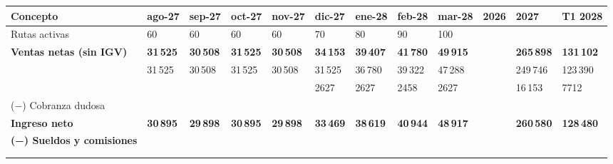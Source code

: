 \documentclass[10.5pt,a4paper]{article}
\begin{document}
{\scriptsize\setlength{\tabcolsep}{2.2pt}\renewcommand{\arraystretch}{0.95}
\begin{tabular}{@{}l*{11}{Q}@{}}
\toprule
Concepto & ago-27 & sep-27 & oct-27 & nov-27 & dic-27 & ene-28 & feb-28 & mar-28 & 2026 & 2027 & T1 2028 \\
\midrule
{\color{tenue}Rutas activas} & {\color{tenue}60} & {\color{tenue}60} & {\color{tenue}60} & {\color{tenue}60} & {\color{tenue}70} & {\color{tenue}80} & {\color{tenue}90} & {\color{tenue}100} &  &  &  \\
\textbf{Ventas netas (sin IGV)} & \textbf{31\,525} & \textbf{30\,508} & \textbf{31\,525} & \textbf{30\,508} & \textbf{34\,153} & \textbf{39\,407} & \textbf{41\,780} & \textbf{49\,915} &  & \textbf{265\,898} & \textbf{131\,102} \\
 & {\color{tenue}31\,525} & {\color{tenue}30\,508} & {\color{tenue}31\,525} & {\color{tenue}30\,508} & {\color{tenue}31\,525} & {\color{tenue}36\,780} & {\color{tenue}39\,322} & {\color{tenue}47\,288} &  & {\color{tenue}249\,746} & {\color{tenue}123\,390} \\
 &  &  &  &  & {\color{tenue}2627} & {\color{tenue}2627} & {\color{tenue}2458} & {\color{tenue}2627} &  & {\color{tenue}16\,153} & {\color{tenue}7712} \\
(−) Cobranza dudosa &  &  &  &  &  &  &  &  &  &  &  \\
\textbf{Ingreso neto} & \textbf{30\,895} & \textbf{29\,898} & \textbf{30\,895} & \textbf{29\,898} & \textbf{33\,469} & \textbf{38\,619} & \textbf{40\,944} & \textbf{48\,917} &  & \textbf{260\,580} & \textbf{128\,480} \\
\textbf{(−) Sueldos y comisiones} & \textbf{} & \textbf{} & \textbf{} & \textbf{} & \textbf{} & \textbf{} & \textbf{} & \textbf{} & \textbf{} & \textbf{} & \textbf{} \\
 & {\color{tenue}} & {\color{tenue}} & {\color{tenue}} & {\color{tenue}} & {\color{tenue}} & {\color{tenue}} & {\color{tenue}} & {\color{tenue}} & {\color{tenue}} & {\color{tenue}} & {\color{tenue}} \\
 &  &  &  &  & {\color{tenue}} & {\color{tenue}} & {\color{tenue}} & {\color{tenue}} & {\color{tenue}} & {\color{tenue}} & {\color{tenue}} \\

\end{tabular}}
\end{document}

